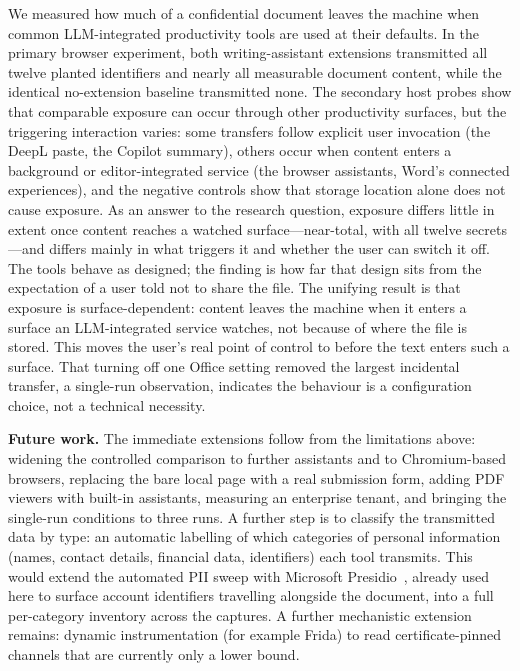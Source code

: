 \documentclass[sigconf,anonymous,review,balance=false]{acmart}
\begin{document}
We measured how much of a confidential document leaves the machine when common
LLM-integrated productivity tools are used at their defaults. In the primary browser
experiment, both writing-assistant extensions transmitted all twelve planted identifiers
and nearly all measurable document content, while the identical no-extension baseline
transmitted none. The secondary host probes show that comparable exposure can occur through
other productivity surfaces, but the triggering interaction varies: some transfers follow
explicit user invocation (the DeepL paste, the Copilot summary), others occur when content
enters a background or editor-integrated service (the browser assistants, Word's connected
experiences), and the negative controls show that storage location alone does not cause
exposure. As an answer to the research question, exposure differs little in extent once
content reaches a watched surface---near-total, with all twelve secrets---and differs mainly
in what triggers it and whether the user can switch it off. The tools behave as designed; the
finding is how far that design sits from the
expectation of a user told not to share the file. The unifying result is that exposure is
surface-dependent: content leaves the machine when it enters a surface an LLM-integrated
service watches, not because of where the file is stored. This moves the user's real point
of control to before the text enters such a surface. That turning off one Office setting
removed the largest incidental transfer, a single-run observation, indicates the behaviour
is a configuration choice, not a technical necessity.

\textbf{Future work.} The immediate extensions follow from the limitations above: widening
the controlled comparison to further assistants and to Chromium-based browsers, replacing
the bare local page with a real submission form, adding PDF viewers with built-in
assistants, measuring an enterprise tenant, and bringing the single-run conditions to three
runs. A further step is to classify the transmitted data by type: an
automatic labelling of which categories of personal information (names, contact details,
financial data, identifiers) each tool transmits. This would extend the automated PII sweep
with Microsoft Presidio~\citep{microsoft2018presidio}, already used here to surface account
identifiers travelling alongside the document, into a full per-category inventory across the
captures. A further mechanistic extension remains: dynamic
instrumentation (for example Frida) to read certificate-pinned channels that are currently
only a lower bound.
\end{document}
